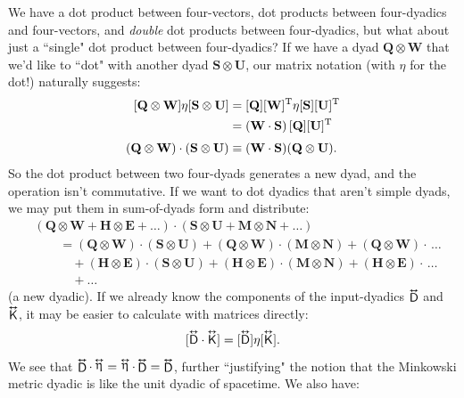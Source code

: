 \documentclass[12pt]{article}
\renewcommand{\vv}[1]{\mathbf{#1}}
\newcommand{\tightoverset}[2]{%
  \mathop{#2}\limits^{\vbox to -.5ex{\kern-0.75ex\hbox{$#1$}\vss}}}
\newcommand{\inlinedy}[1]{\tightoverset{\text{\tiny$\bm\leftrightarrow$}}{#1}}
\newcommand{\capdy}[1]{ \overset{ \text{\tiny$\bm\leftrightarrow$} }{\vphantom{\text{\small{A}}}\smash{#1}} }
\begin{document}
We have a dot product between four-vectors, dot products between four-dyadics and four-vectors, and \emph{double} dot products between four-dyadics, but what about just a ``single" dot product between four-dyadics? If we have a dyad $\vv Q \otimes \vv W$ that we'd like to ``dot" with another dyad $\vv S \otimes \vv U$, our matrix notation (with $\eta$ for the dot!) naturally suggests:
\begin{equation}\label{eq:sddp}
\begin{split}
\mkern0mu [ \vv Q \otimes \vv W ] \eta [ \vv S \otimes \vv U ] &= [\vv Q][\vv W]^{\mathrm{T}} \eta [\vv S][\vv U]^{\mathrm{T}} \\
&= (\vv W \cdot \vv S) \, [\vv Q] [\vv U]^{\mathrm{T}} \\[3pt]
(\vv Q \otimes \vv W) \cdot (\vv S \otimes \vv U) & \equiv (\vv W \cdot \vv S) (\vv Q \otimes \vv U) .
\end{split}
\end{equation}
So the dot product between two four-dyads generates a new dyad, and the operation isn't commutative. If we want to dot dyadics that aren't simple dyads, we may put them in sum-of-dyads form and distribute:
\begin{equation*}
\begin{aligned}
&(\vv Q \otimes \vv W + \vv H \otimes \vv E + \dots ) \cdot (\vv S \otimes \vv U + \vv M \otimes \vv N + \dots ) \\[3pt]
&\qquad = (\vv Q \otimes \vv W) \cdot (\vv S \otimes \vv U) + (\vv Q \otimes \vv W) \cdot (\vv M \otimes \vv N) + (\vv Q \otimes \vv W) \cdot \, \dots \\
& \qquad \quad + (\vv H \otimes \vv E) \cdot (\vv S \otimes \vv U) + (\vv H \otimes \vv E) \cdot (\vv M \otimes \vv N) + (\vv H \otimes \vv E) \cdot \, \dots \\
& \qquad \quad + \dots
\end{aligned}
\end{equation*}
(a new dyadic). If we already know the components of the input-dyadics $\inlinedy{\mathsf{D}}$ and $\inlinedy{\mathsf{K}}$, it may be easier to calculate with matrices directly:
\begin{equation}\label{eq:sdpmatrix}
[\capdy{\mathsf{D}} \cdot \capdy{\mathsf{K}}] = [\capdy{\mathsf{D}}] \eta [\capdy{\mathsf{K}}] .
\end{equation}
We see that $\inlinedy{\mathsf{D}} \cdot \inlinedy{\upeta} = \inlinedy{\upeta} \cdot \inlinedy{\mathsf{D}} =  \inlinedy{\mathsf{D}}$, further ``justifying" the notion that the Minkowski metric dyadic is like the unit dyadic of spacetime. We also have:
\end{document}
